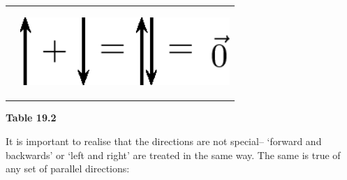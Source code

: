 \begin{center}
\begin{xtabular*}{\mytablewidth}[t]{|p{10\mystarwidth}|p{10\mystarwidth}|}
    \addtocounter{footnote}{-0}
    
                 &
    
    
        
                  
    \setcounter{subfigure}{0}

\label{m38813*id188686}
    \begin{center}
    \label{m38813*id188686!!!underscore!!!media}\label{m38813*id188686!!!underscore!!!printimage}\includegraphics[width=300px]{col11305.imgs/m38813_PG11C1_021.png} %
        
      \vspace{2pt}
    \vspace{.1in}
    
    \end{center}



    \addtocounter{footnote}{-0}
    
     \tabularnewline{}
    \end{xtabular*}
      \end{center}
    \begin{center}{\small\bfseries Table 19.2}\end{center}
    
    \addtocounter{footnote}{-0}
    
    \par
  
        
        \label{m38813*id188697}It is important to realise that the directions are not special-- `forward
and backwards' or `left and right' are treated in the same way. The same is
true of any set of parallel directions:\par 
        
    

